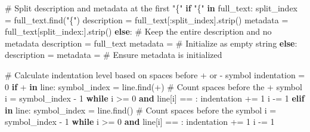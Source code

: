 \documentclass[
  11pt,
  letterpaper,
]{book}
\newenvironment{Shaded}{\begin{snugshade}}{\end{snugshade}}
\newcommand{\CommentTok}[1]{\textcolor[rgb]{0.37,0.37,0.37}{#1}}
\newcommand{\ControlFlowTok}[1]{\textcolor[rgb]{0.00,0.23,0.31}{\textbf{#1}}}
\newcommand{\DecValTok}[1]{\textcolor[rgb]{0.68,0.00,0.00}{#1}}
\newcommand{\KeywordTok}[1]{\textcolor[rgb]{0.00,0.23,0.31}{\textbf{#1}}}
\newcommand{\NormalTok}[1]{\textcolor[rgb]{0.00,0.23,0.31}{#1}}
\newcommand{\OperatorTok}[1]{\textcolor[rgb]{0.37,0.37,0.37}{#1}}
\newcommand{\StringTok}[1]{\textcolor[rgb]{0.13,0.47,0.30}{#1}}
\begin{document}
\begin{Shaded}
\begin{Highlighting}[]
            \CommentTok{\# Split description and metadata at the first "\{"}
            \ControlFlowTok{if} \StringTok{"\{"} \KeywordTok{in}\NormalTok{ full\_text:}
\NormalTok{                split\_index }\OperatorTok{=}\NormalTok{ full\_text.find(}\StringTok{"\{"}\NormalTok{)}
\NormalTok{                description }\OperatorTok{=}\NormalTok{ full\_text[:split\_index].strip()}
\NormalTok{                metadata }\OperatorTok{=}\NormalTok{ full\_text[split\_index:].strip()}
            \ControlFlowTok{else}\NormalTok{:}
                \CommentTok{\# Keep the entire description and no metadata}
\NormalTok{                description }\OperatorTok{=}\NormalTok{ full\_text}
\NormalTok{                metadata }\OperatorTok{=} \StringTok{\textquotesingle{}\textquotesingle{}}  \CommentTok{\# Initialize as empty string}
        \ControlFlowTok{else}\NormalTok{:}
\NormalTok{            description }\OperatorTok{=} \StringTok{\textquotesingle{}\textquotesingle{}}
\NormalTok{            metadata }\OperatorTok{=} \StringTok{\textquotesingle{}\textquotesingle{}}  \CommentTok{\# Ensure metadata is initialized}

        \CommentTok{\# Calculate indentation level based on spaces before + or {-} symbol}
\NormalTok{        indentation }\OperatorTok{=} \DecValTok{0}
        \ControlFlowTok{if} \StringTok{\textquotesingle{}+\textquotesingle{}} \KeywordTok{in}\NormalTok{ line:}
\NormalTok{            symbol\_index }\OperatorTok{=}\NormalTok{ line.find(}\StringTok{\textquotesingle{}+\textquotesingle{}}\NormalTok{)}
            \CommentTok{\# Count spaces before the \textquotesingle{}+\textquotesingle{} symbol}
\NormalTok{            i }\OperatorTok{=}\NormalTok{ symbol\_index }\OperatorTok{{-}} \DecValTok{1}
            \ControlFlowTok{while}\NormalTok{ i }\OperatorTok{\textgreater{}=} \DecValTok{0} \KeywordTok{and}\NormalTok{ line[i] }\OperatorTok{==} \StringTok{\textquotesingle{} \textquotesingle{}}\NormalTok{:}
\NormalTok{                indentation }\OperatorTok{+=} \DecValTok{1}
\NormalTok{                i }\OperatorTok{{-}=} \DecValTok{1}
        \ControlFlowTok{elif} \StringTok{\textquotesingle{}{-}\textquotesingle{}} \KeywordTok{in}\NormalTok{ line:}
\NormalTok{            symbol\_index }\OperatorTok{=}\NormalTok{ line.find(}\StringTok{\textquotesingle{}{-}\textquotesingle{}}\NormalTok{)}
            \CommentTok{\# Count spaces before the \textquotesingle{}{-}\textquotesingle{} symbol}
\NormalTok{            i }\OperatorTok{=}\NormalTok{ symbol\_index }\OperatorTok{{-}} \DecValTok{1}
            \ControlFlowTok{while}\NormalTok{ i }\OperatorTok{\textgreater{}=} \DecValTok{0} \KeywordTok{and}\NormalTok{ line[i] }\OperatorTok{==} \StringTok{\textquotesingle{} \textquotesingle{}}\NormalTok{:}
\NormalTok{                indentation }\OperatorTok{+=} \DecValTok{1}
\NormalTok{                i }\OperatorTok{{-}=} \DecValTok{1}


\end{Highlighting}
\end{Shaded}
\end{document}
